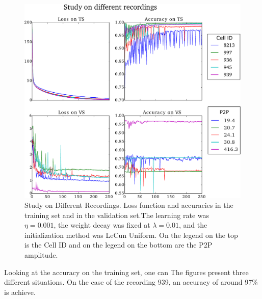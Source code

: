 \documentclass{article}
\begin{document}
\begin{figure}[H]
	\centering
	\includegraphics[width=\linewidth]{study_on_different_cells_v2.pdf}
	\caption{Study on Different Recordings. Loss function and accuracies in the training set and in the validation set.The learning rate was $\eta = 0.001$, the weight decay was fixed at $\lambda = 0.01$, and the initialization method was LeCun Uniform. On the legend on the top is the Cell ID and on the legend on the bottom are the P2P amplitude.
}
\label{fig:study-cells-zoomed}
\end{figure}
Looking at the accuracy on the training set, one can 
The figures present three different situations. On the case of the recording 939, an accuracy of around 97\% is achieve.
\end{document}
